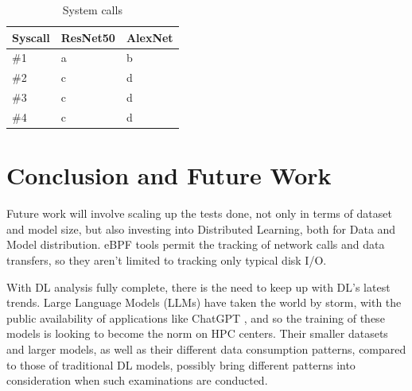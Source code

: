 \documentclass[conference]{IEEEtran}
\begin{document}

\begin{table}
    \caption{System calls}\label{tab:syscalls}
    \begin{center}
        \begin{tabular}[c]{|l|l|l|}
            \hline
            Syscall & ResNet50 & AlexNet\\
            \hline
            \#1 & a & b\\
            \hline
            \#2 & c & d\\
            \hline
            \#3 & c & d\\
            \hline
            \#4 & c & d\\
            \hline
        \end{tabular}
    \end{center}
\end{table}


\section{Conclusion and Future Work}



Future work will involve scaling up the tests done, not only in terms of dataset and model size, but also investing into Distributed Learning, both for Data and Model distribution. eBPF tools permit the tracking of network calls and data transfers, so they aren't limited to tracking only typical disk I/O.

With DL analysis fully complete, there is the need to keep up with DL's latest trends. Large Language Models (LLMs) have taken the world by storm, with the public availability of applications like ChatGPT \cite{chatgpt}, and so the training of these models is looking to become the norm on HPC centers. Their smaller datasets and larger models, as well as their different data consumption patterns, compared to those of traditional DL models, possibly bring different patterns into consideration when such examinations are conducted.


\end{document}
